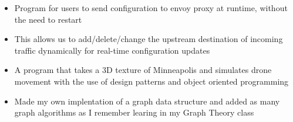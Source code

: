 
\begin{itemize}
\item Program for users to send configuration to envoy proxy at runtime, without the need to restart
\item This allows us to add/delete/change the upstream destination of incoming traffic dynamically for real-time configuration updates

\end{itemize}

\divider

\begin{itemize}
\item A program that takes a 3D texture of Minneapolis and simulates drone movement with the use of design patterns and object oriented programming
\end{itemize}

\divider

\begin{itemize}
\item Made my own implentation of a graph data structure and added as many graph algorithms as I remember learing in my Graph Theory class
\end{itemize}

\divider
